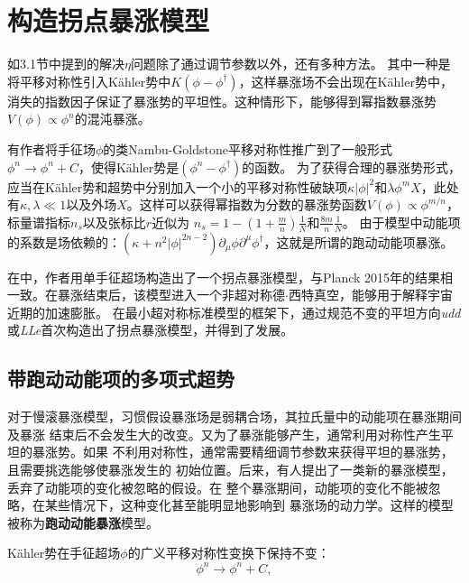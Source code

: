 \section{构造拐点暴涨模型}
如3.1节中提到的解决$\eta$问题\citep{stewart1995inflation,linde1994hybrid,linde1997hybrid,panagiotakopoulos1997hybrid}除了通过调节参数以外，还有多种方法。
其中一种是将平移对称性引入K\"ahler势中$K(\phi-\phi^\dagger)$，这样暴涨场不会出现在K\"ahler势中，消失的指数因子保证了暴涨势的平坦性。这种情形下，能够得到幂指数暴涨势$V(\phi)\propto
\phi^n$的混沌暴涨。

有作者\citep{takahashi2010linear,nakayama2010running,kasuya2014flat}将手征场$\phi$的类Nambu-Goldstone平移对称性推广到了一般形式$\phi^n\rightarrow
\phi^n+C$，使得K\"ahler势是$\left(\phi^n-\phi^\dagger\right)$的函数。
为了获得合理的暴涨势形式，应当在K\"{a}hler势和超势中分别加入一个小的平移对称性破缺项$\kappa|\phi|^2$和$\lambda\phi^m
X$，此处有$\kappa,\lambda\ll
1$以及外场$X$。这样可以获得幂指数为分数的暴涨势函数$V(\phi)\propto
\phi^{m/n}$，标量谱指标$n_s$以及张标比$r$近似为
$n_s=1-(1+\frac{m}{n})\frac{1}{N}$和$\frac{8m}{n}\frac{1}{N}$\citep{nakayama2010running}。
由于模型中动能项的系数是场依赖的：$(\kappa+n^2|\phi|^{2n-2})\partial_{\mu}\phi\partial^{\mu}\phi^{\dag}$，这就是所谓的跑动动能项暴涨。


在\citep{gao2015inflection}中，作者用单手征超场构造出了一个拐点暴涨模型，与Planck
2015年的结果相一致。在暴涨结束后，该模型进入一个非超对称德$\cdot$西特真空，能够用于解释宇宙近期的加速膨胀。
在最小超对称标准模型的框架下，通过规范不变的平坦方向\textit{udd}或\textit{LLe}首次构造出了拐点暴涨模型\citep{allahverdi2006gauge}，并得到了发展\citep{allahverdi2007term,enqvist2010inflection,hotchkiss2012observable,chatterjee2015bound}。


\subsection{带跑动动能项的多项式超势}
对于慢滚暴涨模型，习惯假设暴涨场是弱耦合场，其拉氏量中的动能项在暴涨期间及暴涨
结束后不会发生大的改变。又为了暴涨能够产生，通常利用对称性产生平坦的暴涨势。如果
不利用对称性，通常需要精细调节参数来获得平坦的暴涨势，且需要挑选能够使暴涨发生的
初始位置。后来，有人提出了一类新的暴涨模型，丢弃了动能项的变化被忽略的假设。在
整个暴涨期间，动能项的变化不能被忽略，在某些情况下，这种变化甚至能明显地影响到
暴涨场的动力学。这样的模型被称为\textbf{跑动动能暴涨}模型。


K\"ahler势在手征超场$\phi$的广义平移对称性变换下保持不变：
\begin{equation}
    \phi^n \rightarrow \phi^n + C,
\end{equation}

